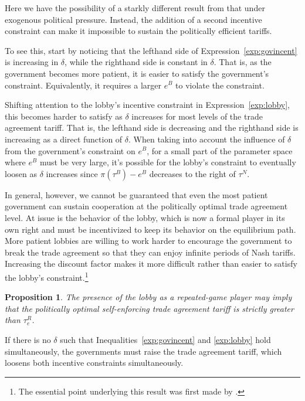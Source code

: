 \documentclass[12pt]{article}
\newtheorem{proposition}{Proposition}
\newcommand{\de}{\delta}
\begin{document}
Here we have the possibility of a starkly different result from that under exogenous political pressure. Instead, the addition of a second incentive constraint can make it impossible to sustain the politically efficient tariffs.

To see this, start by noticing that the lefthand side of Expression~\ref{exp:govincent} is increasing in $\de$, while the righthand side is constant in $\de$. That is, as the government becomes more patient, it is easier to satisfy the government's constraint. Equivalently, it requires a larger $e^B$ to violate the constraint.

Shifting attention to the lobby's incentive constraint in Expression~\ref{exp:lobby}, this becomes harder to satisfy as $\de$ increases for most levels of the trade agreement tariff. That is, the lefthand side is decreasing and the righthand side is increasing as a direct function of $\de$. When taking into account the influence of $\de$ from the government's constraint on $e^B$, for a small part of the parameter space where $e^B$ must be very large, it's possible for the lobby's constraint to eventually loosen as $\de$ increases since $\pi(\tau^B) - e^B$ decreases to the right of $\tau^N$.

In general, however, we cannot be guaranteed that even the most patient government can sustain cooperation at the politically optimal trade agreement level. At issue is the behavior of the lobby, which is now a formal player in its own right and must be incentivized to keep its behavior on the equilibrium path. More patient lobbies are willing to work harder to encourage the government to break the trade agreement so that they can enjoy infinite periods of Nash tariffs. Increasing the discount factor makes it more difficult rather than easier to satisfy the lobby's constraint.\footnote{The essential point underlying this result was first made by \Textcite{buzard2013a}.}

\begin{proposition}
  The presence of the lobby as a repeated-game player may imply that the politically optimal self-enforcing trade agreement tariff is strictly greater than $\tau_e^R$.
	\label{res:repeated}
\end{proposition}

If there is no $\de$ such that Inequalities~\ref{exp:govincent} and \ref{exp:lobby} hold simultaneously, the governments must raise the trade agreement tariff, which loosens both incentive constraints simultaneously.
\end{document}
